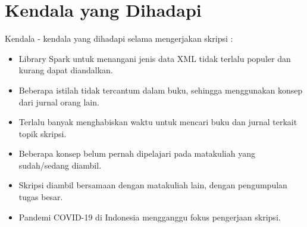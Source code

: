 \documentclass[a4paper,twoside]{article}
\begin{document}
\section{Kendala yang Dihadapi}
Kendala - kendala yang dihadapi selama mengerjakan skripsi :
\begin{itemize}
	\item Library Spark untuk menangani jenis data XML tidak terlalu populer dan kurang dapat diandalkan.
	\item Beberapa istilah tidak tercantum dalam buku, sehingga menggunakan konsep dari jurnal orang lain.
	\item Terlalu banyak menghabiskan waktu untuk mencari buku dan jurnal terkait topik skripsi.
	\item Beberapa konsep belum pernah dipelajari pada matakuliah yang sudah/sedang diambil.
	\item Skripsi diambil bersamaan dengan matakuliah lain, dengan pengumpulan tugas besar.
	\item Pandemi COVID-19 di Indonesia mengganggu fokus pengerjaan skripsi.
\end{itemize}
	
\end{document}
